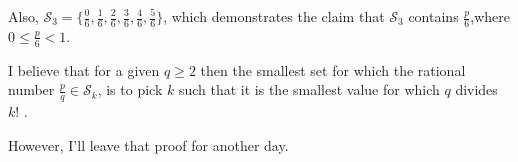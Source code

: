 \documentclass{article}
\begin{document}
Also, \(
\mathcal{S}_3
= \{
\frac{ 0}{6},
\frac{ 1}{6},
\frac{ 2}{6},
\frac{ 3}{6},
\frac{ 4}{6},
\frac{ 5}{6}
\}
\),
which demonstrates the claim that \(\mathcal{S}_3\)
contains \(\frac{p}{6}\),\newline where \(0 \le{} \frac{p}{6} < 1\).

I believe that for a given \(q \ge 2\) then the smallest set for which the rational number
\(\frac{p}{q} \in \mathcal{S}_k\),
is to pick
\(k\) such that it is the smallest value for which
\(q\) divides \(k!\)\! .

However, I'll leave that proof for another day.
\end{document}

